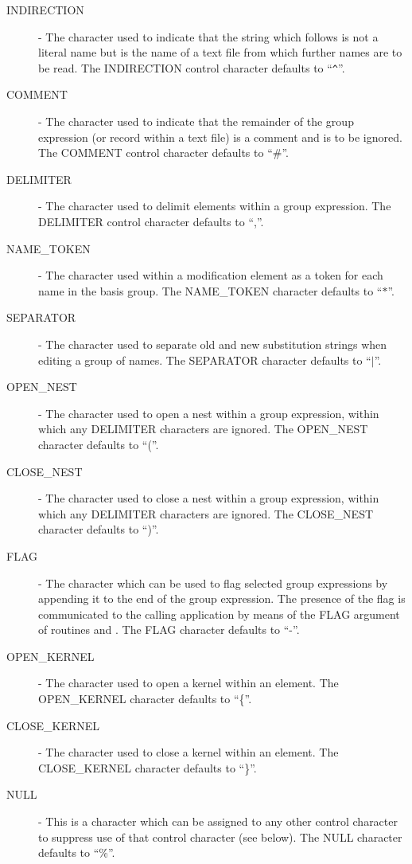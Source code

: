 \begin{description}
\item [INDIRECTION] - The character used to indicate that the string which
follows is not a literal name but is the name of a text file from which further
names are to be read. The INDIRECTION control character defaults to
``\verb+^+''.

\item [COMMENT] - The character used to indicate that the remainder of the group
expression (or record within a text file) is a comment and is to be ignored.
The COMMENT control character defaults to ``\#''.

\item [DELIMITER] - The character used to delimit elements within a group
expression. The DELIMITER control character defaults to ``,''.

\item [NAME\_TOKEN] - The character used within a modification element as a
token for each name in the basis group. The NAME\_TOKEN character defaults to
``$*$''.

\item [SEPARATOR] - The character used to separate old and new substitution
strings when editing a group of names. The SEPARATOR character defaults to
``$\mid$''.

\item [OPEN\_NEST] - The character used to open a nest within a group
expression, within which any DELIMITER characters are ignored. The OPEN\_NEST
character defaults to ``(''.

\item [CLOSE\_NEST] - The character used to close a nest within a group
expression, within which any DELIMITER characters are ignored. The CLOSE\_NEST
character defaults to ``)''.

\item [FLAG] - The character which can be used to flag selected group
expressions by appending it to the end of the group expression. The presence of
the flag is communicated to the calling application by means of the FLAG
argument of routines  and . The FLAG character defaults
to ``-''.

\item [OPEN\_KERNEL] - The character used to open a kernel within an element.
The OPEN\_KERNEL character defaults to ``\{''.

\item [CLOSE\_KERNEL] - The character used to close a kernel within an element.
The CLOSE\_KERNEL character defaults to ``\}''.

\item [NULL] - This is a character which can be assigned to any other control
character to suppress use of that control character (see below). The NULL
character defaults to ``\%''.

\end{description}

